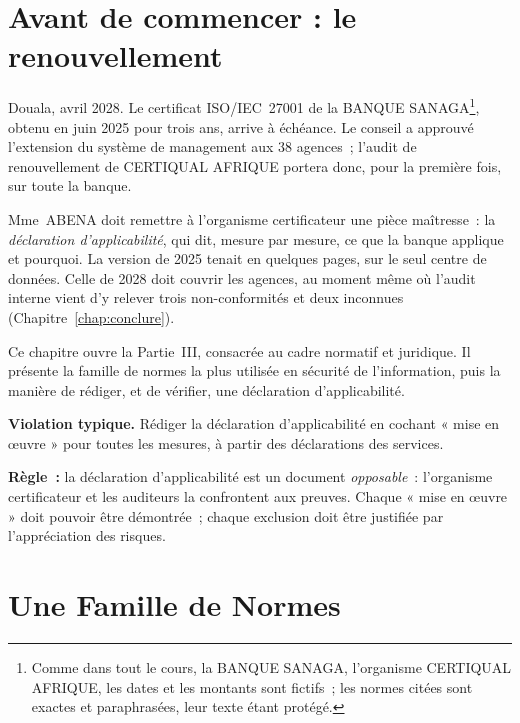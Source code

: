 \bigskip

\section*{Avant de commencer : le renouvellement}

Douala, avril 2028. Le certificat ISO/IEC~27001 de la BANQUE
SANAGA\footnote{Comme dans tout le cours, la BANQUE SANAGA, l'organisme
CERTIQUAL AFRIQUE, les dates et les montants sont fictifs~; les normes
citées sont exactes et paraphrasées, leur texte étant protégé.}, obtenu en
juin 2025 pour trois ans, arrive à échéance. Le conseil a approuvé
l'extension du système de management aux 38 agences~; l'audit de
renouvellement de CERTIQUAL AFRIQUE portera donc, pour la première fois,
sur toute la banque.

Mme~ABENA doit remettre à l'organisme certificateur une pièce maîtresse~:
la \emph{déclaration d'applicabilité}, qui dit, mesure par mesure, ce que
la banque applique et pourquoi. La version de 2025 tenait en quelques pages,
sur le seul centre de données. Celle de 2028 doit couvrir les agences, au
moment même où l'audit interne vient d'y relever trois non-conformités et
deux inconnues (Chapitre~\ref{chap:conclure}).

\medskip

Ce chapitre ouvre la Partie~III, consacrée au cadre normatif et
juridique. Il présente la famille de normes la plus utilisée en sécurité
de l'information, puis la manière de rédiger, et de vérifier, une
déclaration d'applicabilité.

\begin{boxalert}
\textbf{Violation typique.} Rédiger la déclaration d'applicabilité en
cochant « mise en œuvre » pour toutes les mesures, à partir des
déclarations des services.

\smallskip
\textbf{Règle~:} la déclaration d'applicabilité est un document
\emph{opposable}~: l'organisme certificateur et les auditeurs la
confrontent aux preuves. Chaque « mise en œuvre » doit pouvoir être
démontrée~; chaque exclusion doit être justifiée par l'appréciation des
risques.
\end{boxalert}

\separateur

\section{Une Famille de Normes}
\label{sec:c08-famille}

